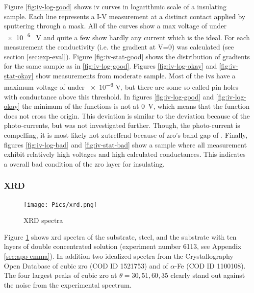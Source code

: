 Figure \ref{fig:iv-log-good} shows \gls{iv} curves in logarithmic scale of a insulating sample. 
Each line represents a I-V measurement at a distinct contact applied by sputtering through a mask. 
All of the curves show a max voltage of under \num{e-6} \SI{}{\volt} 
and quite a few show hardly any current which is the ideal. 
For each measurement the conductivity (i.e. the gradient at V=0) was calculated (see section \ref{sec:exp-eval}). 
Figure \ref{fig:iv-stat-good} shows the distribution of gradients for the same sample as in \ref{fig:iv-log-good}.
%
Figures \ref{fig:iv-log-okay} and \ref{fig:iv-stat-okay} show measurements from moderate sample. 
Most of the \gls{iv}s have a maximum voltage of under \num{e-6} V, 
but there are some so called pin holes with conductance above this threshold. %
%
In figures \ref{fig:iv-log-good} and \ref{fig:iv-log-okay} the minimum of the functions 
is not at \SI{0}{\volt}, which means that the function does not cross the origin. 
This deviation is similar to the deviation because of the photo-currents\cite{perez2018solar}, 
but was not investigated further. 
Though, the photo-current is compelling, it is most likely not zutreffend because of \gls{zro}'s band gap of \cite{sinhamahapatra2016oxygen}.
%
Finally, figures \ref{fig:iv-log-bad} and \ref{fig:iv-stat-bad} show a sample 
where all measurement exhibit relatively high voltages and high calculated conductances. 
This indicates a overall bad condition of the \gls{zro} layer for insulating. 

\subsubsection{XRD}
\begin{figure}
	\centering
	\texttt{[image: Pics/xrd.png]}
	\caption{XRD spectra}
	\label{fig:xrd}
\end{figure}

Figure \ref{fig:xrd} shows \gls{xrd} spectra of the substrate, steel, and 
the substrate with ten layers of double concentrated solution (experiment number 6113, see Appendix \ref{sec:app-emma}).
In addition two idealized spectra from the Crystallography Open Database of cubic \gls{zro} (COD ID 1521753\cite{gkatz1971xray}) and of $\alpha$-Fe (COD ID 1100108).
The four largest peaks of cubic \gls{zro} at $\theta=30, 51, 60, 35$ clearly stand out against the noise from the experimental spectrum. %

